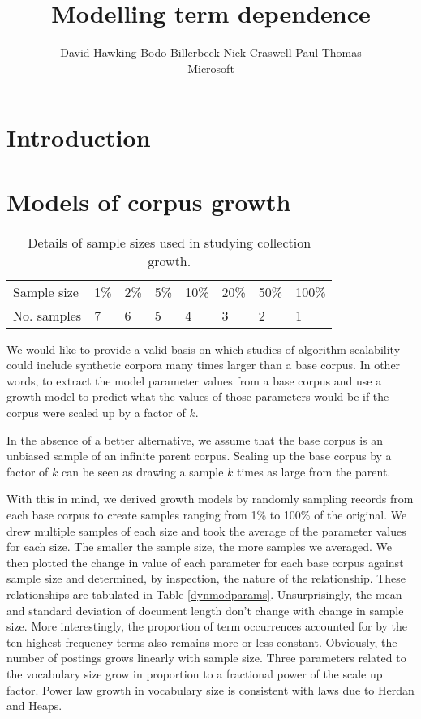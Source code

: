\documentclass{sig-alternate}
\title{Modelling term dependence}
\author{David Hawking
Bodo Billerbeck
Nick Craswell
Paul Thomas\\
Microsoft}
\begin{document}
\maketitle{}

\begin{abstract}

\end{abstract}

\section{Introduction}   %



\section{Models of corpus growth}  %
\label{GrowthModels}

\begin{table}
\centering
\label{samples}
\begin{tabular}{l|lllllll}
\hline
Sample size & 1\% & 2\% & 5\% & 10\% & 20\% & 50\% & 100\%\\
No. samples & 7 & 6 & 5 & 4 & 3 & 2 & 1\\
\hline
\end{tabular}
\caption{Details of sample sizes used in studying collection growth.
\label{t:samples}}
\end{table}

We would like to provide a valid basis on which studies of algorithm
scalability could include synthetic corpora many times larger
than a base corpus.  In other words, to extract the model parameter values from a
base corpus and use a growth model to predict what the values of those
parameters would be if the corpus were scaled up by a factor of $k$.

In the absence of a better alternative, we assume that the base corpus
is an unbiased sample of an infinite parent corpus.  Scaling up the
base corpus by a factor of $k$ can be seen as drawing a sample $k$
times as large from the parent.

With this in mind, we derived growth models by randomly sampling
records from each base corpus to create samples ranging from 1\% to
100\% of the original.  We drew multiple samples of each size and took
the average of the parameter values for each size. The smaller the
sample size, the more samples we averaged.  We then plotted the change
in value of each parameter for each base corpus against sample size and 
determined, by inspection, the nature of the relationship.  These
relationships are tabulated in Table \ref{dynmodparams}.
Unsurprisingly, the mean and standard deviation of document length
don't change with change in sample size.  More interestingly, the
proportion of term occurrences accounted for by the ten highest
frequency terms also remains more or less constant.  Obviously,
the number of postings grows linearly with sample size.  Three
parameters related to the vocabulary size grow in proportion to a
fractional power of the scale up factor.  Power law growth in
vocabulary size is consistent with laws due to Herdan and Heaps. 
\end{document}
